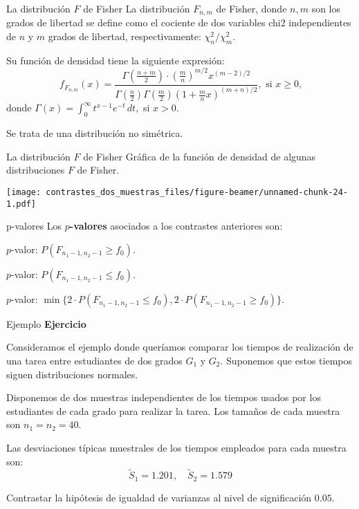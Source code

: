 \documentclass[
  ignorenonframetext,
]{beamer}
\begin{document}
\begin{frame}{La distribución \(F\) de Fisher}
\protect\hypertarget{la-distribuciuxf3n-f-de-fisher}{}
La distribución \(F_{n,m}\) de Fisher, donde \(n,m\) son los grados de
libertad se define como el cociente de dos variables chi2 independientes
de \(n\) y \(m\) grados de libertad, respectivamente:
\({\chi_{n}^2}/{\chi_m^2}\).

Su función de densidad tiene la siguiente expresión: \[
f_{F_{n,m}}(x)=\frac{\Gamma\left(\frac{n+m}2\right)\cdot\left(\frac{m}{n}\right)^{m/2}x^{(m-2)/2}}
{\Gamma\left(\frac{n}2\right)\Gamma\left(\frac{m}2\right)\left(1+\frac{m}{n}x\right)^{(m+n)/2}},
\mbox{ si $x\geq 0$,}
\] donde \(\Gamma(x)=\int_0^{\infty} t^{x-1}e^{-t}\, dt,\) si \(x> 0\).

Se trata de una distribución no simétrica.
\end{frame}

\begin{frame}{La distribución \(F\) de Fisher}
\protect\hypertarget{la-distribuciuxf3n-f-de-fisher-1}{}
Gráfica de la función de densidad de algunas distribuciones \(F\) de
Fisher.

\texttt{[image: contrastes\_dos\_muestras\_files/figure-beamer/unnamed-chunk-24-1.pdf]}
\end{frame}

\begin{frame}{p-valores}
\protect\hypertarget{p-valores}{}
Los \textbf{\(p\)-valores} asociados a los contrastes anteriores son:

\(p\)-valor: \(P(F_{n_1-1,n_2-1}\geq f_0)\).

\(p\)-valor: \(P(F_{n_1-1,n_2-1}\leq f_0)\).

\(p\)-valor:
\(\min\{2\cdot P(F_{n_1-1,n_2-1}\leq f_0),2\cdot P(F_{n_1-1,n_2-1}\geq f_0)\}\).
\end{frame}

\begin{frame}{Ejemplo}
\protect\hypertarget{ejemplo-19}{}
\textbf{Ejercicio}

Consideramos el ejemplo donde queríamos comparar los tiempos de
realización de una tarea entre estudiantes de dos grados \(G_1\) y
\(G_2\). Suponemos que estos tiempos siguen distribuciones normales.

Disponemos de dos muestras independientes de los tiempos usados por los
estudiantes de cada grado para realizar la tarea. Los tamaños de cada
muestra son \(n_1=n_2=40\).

Las desviaciones típicas muestrales de los tiempos empleados para cada
muestra son: \[
\widetilde{S}_1=1.201,\quad \widetilde{S}_2=1.579
\]

Contrastar la hipótesis de igualdad de varianzas al nivel de
significación \(0.05\).
\end{frame}
\end{document}
